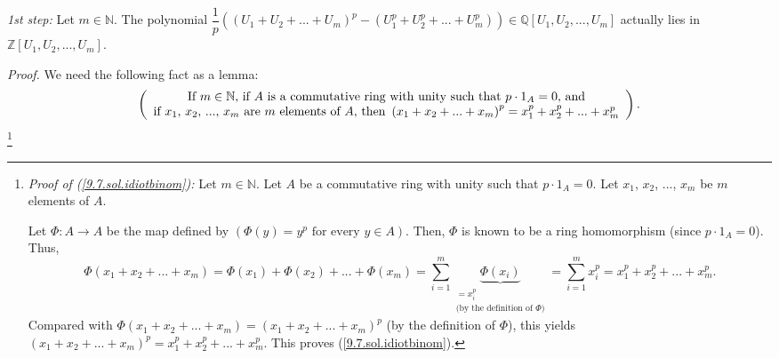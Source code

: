 \documentclass[numbers=enddot,12pt,final,onecolumn,notitlepage]{scrartcl}%
\begin{document}
\textit{1st step:} Let $m\in\mathbb{N}$. The polynomial $\dfrac{1}{p}\left(
\left(  U_{1}+U_{2}+...+U_{m}\right)  ^{p}-\left(  U_{1}^{p}+U_{2}%
^{p}+...+U_{m}^{p}\right)  \right)  \in\mathbb{Q}\left[  U_{1},U_{2}%
,...,U_{m}\right]  $ actually lies in $\mathbb{Z}\left[  U_{1},U_{2}%
,...,U_{m}\right]  $.

\textit{Proof.} We need the following fact as a lemma:%
\begin{equation}
\left(
\begin{array}
[c]{c}%
\text{If }m\in\mathbb{N}\text{, if }A\text{ is a commutative ring with unity
such that }p\cdot1_{A}=0\text{, and}\\
\text{if }x_{1}\text{, }x_{2}\text{, }...\text{, }x_{m}\text{ are }m\text{
elements of }A\text{, then }\left(  x_{1}+x_{2}+...+x_{m}\right)  ^{p}%
=x_{1}^{p}+x_{2}^{p}+...+x_{m}^{p}%
\end{array}
\right)  . \label{9.7.sol.idiotbinom}%
\end{equation}
\footnote{\textit{Proof of (\ref{9.7.sol.idiotbinom}):} Let $m\in\mathbb{N}$.
Let $A$ be a commutative ring with unity such that $p\cdot1_{A}=0$. Let
$x_{1}$, $x_{2}$, $...$, $x_{m}$ be $m$ elements of $A$.
\par
Let $\Phi:A\rightarrow A$ be the map defined by $\left(  \Phi\left(  y\right)
=y^{p}\text{ for every }y\in A\right)  $. Then, $\Phi$ is known to be a ring
homomorphism (since $p\cdot1_{A}=0$). Thus,
\[
\Phi\left(  x_{1}+x_{2}+...+x_{m}\right)  =\Phi\left(  x_{1}\right)
+\Phi\left(  x_{2}\right)  +...+\Phi\left(  x_{m}\right)  =\sum\limits_{i=1}%
^{m}\underbrace{\Phi\left(  x_{i}\right)  }_{\substack{=x_{i}^{p}\\\text{(by
the definition of }\Phi\text{)}}}=\sum\limits_{i=1}^{m}x_{i}^{p}=x_{1}%
^{p}+x_{2}^{p}+...+x_{m}^{p}.
\]
Compared with $\Phi\left(  x_{1}+x_{2}+...+x_{m}\right)  =\left(  x_{1}%
+x_{2}+...+x_{m}\right)  ^{p}$ (by the definition of $\Phi$), this yields
$\left(  x_{1}+x_{2}+...+x_{m}\right)  ^{p}=x_{1}^{p}+x_{2}^{p}+...+x_{m}^{p}%
$. This proves (\ref{9.7.sol.idiotbinom}).}
\end{document}
